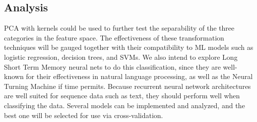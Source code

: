 \documentclass{article}
\begin{document}
\subsection{Analysis}
PCA with kernels could be used to further test the separability of the three categories in the feature space. The effectiveness of these transformation techniques will be gauged together with their compatibility to ML models such as logistic regression, decision trees, and SVMs.
We also intend to explore Long Short Term Memory neural nets to do this classification, since they are well-known for their effectiveness in natural language processing, as well as the Neural Turning Machine if time permits. Because recurrent neural network architectures are well suited for sequence data such as text, they should perform well when classifying the data. Several models can be implemented and analyzed, and the best one will be selected for use via cross-validation.



\end{document}
